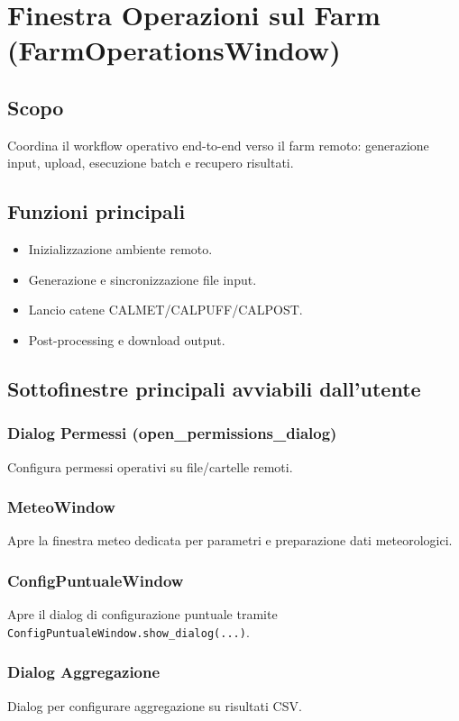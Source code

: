 \chapter{Finestra Operazioni sul Farm (FarmOperationsWindow)}

\section{Scopo}
Coordina il workflow operativo end-to-end verso il farm remoto: generazione input, upload, esecuzione batch e recupero risultati.

\section{Funzioni principali}
\begin{itemize}[leftmargin=1.5em]
  \item Inizializzazione ambiente remoto.
  \item Generazione e sincronizzazione file input.
  \item Lancio catene CALMET/CALPUFF/CALPOST.
  \item Post-processing e download output.
\end{itemize}

\section{Sottofinestre principali avviabili dall'utente}
\subsection{Dialog Permessi (open\_permissions\_dialog)}
Configura permessi operativi su file/cartelle remoti.

\subsection{MeteoWindow}
Apre la finestra meteo dedicata per parametri e preparazione dati meteorologici.

\subsection{ConfigPuntualeWindow}
Apre il dialog di configurazione puntuale tramite \texttt{ConfigPuntualeWindow.show\_dialog(...)}.

\subsection{Dialog Aggregazione}
Dialog per configurare aggregazione su risultati CSV.

